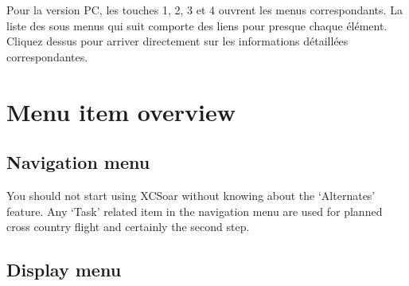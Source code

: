 Pour la version PC, les touches 1, 2, 3 et 4 ouvrent les menus correspondants. La liste des sous menus qui suit comporte des liens pour presque chaque élément. Cliquez dessus pour arriver directement sur les informations détaillées correspondantes.

\section{Menu item overview}

\subsection*{Navigation menu}
\noindent{}

You should not start using XCSoar without knowing about the `Alternates' feature.
Any `Task' related item in the navigation menu are used for planned cross
country flight and certainly the second step.

\subsection*{Display menu}
\noindent{}

